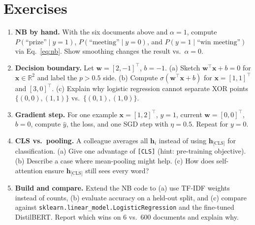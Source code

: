 \section{Exercises}
\label{sec:ch03-exercises}
\begin{enumerate}[label=E3.\arabic*, leftmargin=*, itemsep=0.7em]
    \item \textbf{NB by hand.} With the six documents above and $\alpha=1$, compute $P(\text{``prize''}\mid y=1)$, $P(\text{``meeting''}\mid y=0)$, and $P(y=1\mid\text{``win meeting''})$ via Eq.~\eqref{eq:nb}. Show smoothing changes the result vs.\ $\alpha=0$.
    \item \textbf{Decision boundary.} Let $\mathbf{w}=[2,-1]^\top$, $b=-1$. (a) Sketch $\mathbf{w}^\top\mathbf{x}+b=0$ for $\mathbf{x}\in\mathbb{R}^2$ and label the $p>0.5$ side. (b) Compute $\sigma(\mathbf{w}^\top\mathbf{x}+b)$ for $\mathbf{x}=[1,1]^\top$ and $[3,0]^\top$. (c) Explain why logistic regression cannot separate XOR points $\{(0,0),(1,1)\}$ vs.\ $\{(0,1),(1,0)\}$.
    \item \textbf{Gradient step.} For one example $\mathbf{x}=[1,2]^\top$, $y=1$, current $\mathbf{w}=[0,0]^\top$, $b=0$, compute $\hat{y}$, the loss, and one SGD step with $\eta=0.5$. Repeat for $y=0$.
    \item \textbf{CLS vs.\ pooling.} A colleague averages all $\mathbf{h}_i$ instead of using $\mathbf{h}_{\text{[CLS]}}$ for classification. (a) Give one advantage of \texttt{[CLS]} (hint: pre-training objective). (b) Describe a case where mean-pooling might help. (c) How does self-attention ensure $\mathbf{h}_{\text{[CLS]}}$ still sees every word?
    \item \textbf{Build and compare.} Extend the NB code to (a) use TF-IDF weights instead of counts, (b) evaluate accuracy on a held-out split, and (c) compare against \texttt{sklearn.linear\_model.LogisticRegression} and the fine-tuned DistilBERT. Report which wins on 6 vs.\ 600 documents and explain why.
\end{enumerate}
